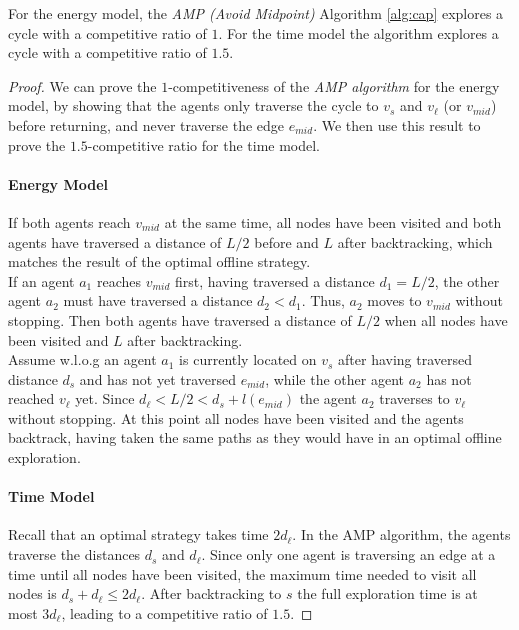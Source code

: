 \begin{theorem}\label{ampCycles}
    For the energy model, the \textit{AMP (Avoid Midpoint)} Algorithm \ref{alg:cap} explores a cycle with
    a competitive ratio of $1$. For the time model the algorithm explores a cycle with
    a competitive ratio of $1.5$.
\end{theorem}


\begin{proof}
    We can prove the $1$-competitiveness of the \textit{AMP algorithm} for the energy model, by showing that
    the agents only traverse the cycle to $v_s$ and $v_\ell$ (or $v_{mid}$) before returning, and never traverse the edge $e_{mid}$. We then use this result to prove
    the $1.5$-competitive ratio for the time model.

    \paragraph*{Energy Model} If both agents reach $v_{mid}$ at the same time, all nodes have been visited and both agents have traversed a distance of $L/2$ before and $L$ after backtracking, which matches 
    the result of the optimal offline strategy.\\
     If an agent $a_1$ reaches $v_{mid}$ first, having traversed a distance $d_1 = L/2$, the other agent $a_2$ must have traversed a distance $d_2 < d_1$. Thus, $a_2$ moves to $v_{mid}$ without stopping.
     Then both agents have traversed a distance of $L/2$ when all nodes have been visited and $L$ after backtracking.\\
    Assume w.l.o.g an agent $a_1$ is currently located on $v_s$ after having traversed distance $d_s$ and has not yet traversed $e_{mid}$, while the other agent $a_2$ has not reached $v_\ell$ yet.
    Since $d_\ell < L/2 < d_s + l(e_{mid})$ the agent $a_2$ traverses to $v_\ell$ without stopping. At this point all nodes have been visited and the agents backtrack, having taken the same paths
    as they would have in an optimal offline exploration.

    \paragraph*{Time Model} Recall that an optimal strategy takes time $2d_\ell$. In the AMP algorithm, the agents traverse the distances $d_s$ and $d_\ell$. 
    Since only one agent is traversing an edge at a time until all nodes have been visited, the maximum 
    time needed to visit all nodes is $d_s + d_\ell \leq 2d_\ell$. After backtracking to $s$ the full exploration time is at most $3d_\ell$, leading to a competitive ratio of $1.5$.
\end{proof}
